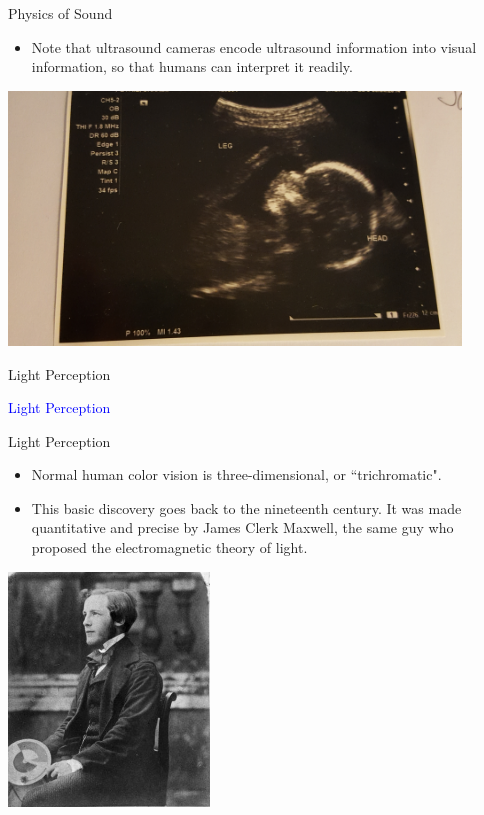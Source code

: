 \documentclass{beamer}
\begin{document}
\begin{frame}{Physics of Sound}
   \begin{itemize}
      \item Note that ultrasound cameras encode ultrasound information into visual information, so that humans can interpret it readily.
   \end{itemize}
   \begin{center}
      \includegraphics[width=0.9\textwidth]{figures/ultrasound.jpg}
   \end{center}
\end{frame}

\begin{frame}{Light Perception}
   \begin{center}
      \Huge \textcolor{blue}{Light Perception}
   \end{center}
\end{frame}

\begin{frame}{Light Perception}
   \begin{itemize}
      \item Normal human color vision is three-dimensional, or ``trichromatic".
      \item This basic discovery goes back to the nineteenth century. It was made quantitative and precise by James Clerk Maxwell, the same guy who proposed the electromagnetic theory of light.
   \end{itemize}
   \begin{center}
      \includegraphics[width=0.4\textwidth]{figures/maxwell.jpg}
   \end{center}
\end{frame}
\end{document}
